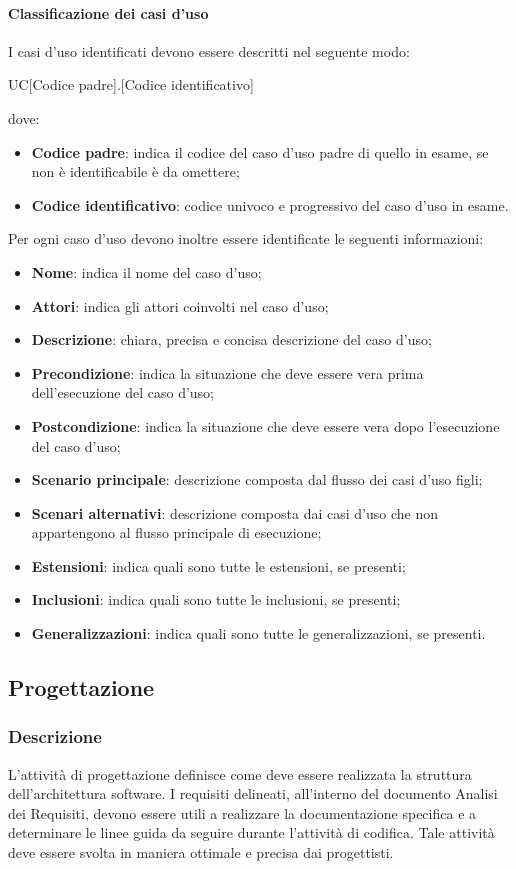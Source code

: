 \paragraph{Classificazione dei casi d'uso}
I casi d'uso identificati devono essere descritti nel seguente modo:
\begin{center}
  UC[Codice padre].[Codice identificativo]
\end{center}
dove:
\begin{itemize}
  \item\textbf{Codice padre}: indica il codice del caso d'uso padre di quello in 
  esame, se non è identificabile è da omettere;
  \item\textbf{Codice identificativo}: codice univoco e progressivo del caso d'uso in esame. 
\end{itemize}
Per ogni caso d'uso devono inoltre essere identificate le seguenti informazioni:
\begin{itemize}
  \item\textbf{Nome}: indica il nome del caso d'uso;
  \item\textbf{Attori}: indica gli attori coinvolti nel caso d'uso;
  \item\textbf{Descrizione}: chiara, precisa e concisa descrizione del caso 
  d'uso;
  \item\textbf{Precondizione}: indica la situazione che deve essere vera prima 
  dell'esecuzione del caso d'uso;
  \item\textbf{Postcondizione}: indica la situazione che deve essere vera dopo 
  l'esecuzione del caso d'uso;
  \item\textbf{Scenario principale}: descrizione composta dal flusso dei casi d'uso 
  figli;
  \item\textbf{Scenari alternativi}: descrizione composta dai casi d'uso che non 
  appartengono al flusso principale di esecuzione;
  \item\textbf{Estensioni}: indica quali sono tutte le estensioni, se presenti;
  \item\textbf{Inclusioni}: indica quali sono tutte le inclusioni, se presenti;
  \item\textbf{Generalizzazioni}: indica quali sono tutte le generalizzazioni, 
  se presenti.
\end{itemize}
\subsection{Progettazione}

\subsubsection{Descrizione}
L'attività di progettazione definisce come deve essere realizzata la struttura dell'architettura software. I requisiti delineati, all'interno del documento Analisi dei Requisiti, devono essere utili a realizzare la documentazione specifica e a determinare le linee guida da seguire durante l'attività di codifica. 
Tale attività deve essere svolta in maniera ottimale e precisa dai progettisti.  
  
